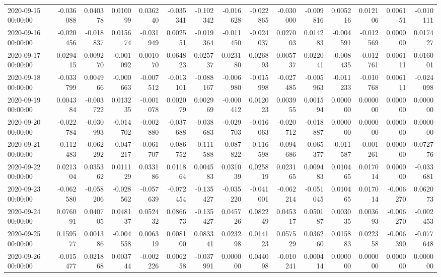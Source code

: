 \begin{tabular}{lrrrrrrrrrrrrrr}
2020-09-15 00:00:00 & -0.036088 & 0.040378 & 0.010099 & 0.036240 & -0.035341 & -0.102342 & -0.016628 & -0.022865 & -0.030000 & -0.009816 & 0.005216 & 0.012106 & 0.006151 & -0.010111 \\
2020-09-16 00:00:00 & -0.020456 & -0.018837 & 0.015674 & -0.031949 & 0.002551 & -0.019364 & -0.011450 & -0.024037 & 0.027003 & 0.014283 & -0.004591 & -0.012569 & 0.000000 & 0.017427 \\
2020-09-17 00:00:00 & 0.029415 & 0.009270 & -0.001092 & 0.001070 & 0.064823 & 0.025737 & 0.023180 & 0.026893 & 0.005737 & 0.022041 & -0.008435 & -0.012761 & 0.006111 & 0.016001 \\
2020-09-18 00:00:00 & -0.033799 & 0.004966 & -0.000663 & -0.007512 & -0.013101 & -0.088167 & -0.006980 & -0.015998 & -0.027485 & -0.005963 & -0.011233 & -0.010768 & 0.006111 & -0.024098 \\
2020-09-19 00:00:00 & 0.004384 & -0.003722 & 0.013235 & -0.001078 & 0.002079 & 0.002969 & -0.000412 & 0.012023 & 0.003955 & 0.001594 & 0.000000 & 0.000000 & 0.000000 & 0.000000 \\
2020-09-20 00:00:00 & -0.022784 & -0.030993 & -0.014702 & -0.002880 & -0.037688 & -0.038683 & -0.029703 & -0.016063 & -0.020712 & -0.018887 & 0.000000 & 0.000000 & 0.000000 & 0.000000 \\
2020-09-21 00:00:00 & -0.112483 & -0.062292 & -0.047217 & -0.061707 & -0.086752 & -0.111588 & -0.087822 & -0.116598 & -0.094686 & -0.065377 & -0.011587 & -0.001261 & 0.000000 & 0.072776 \\
2020-09-22 00:00:00 & 0.021304 & 0.035362 & 0.011129 & 0.033186 & 0.011864 & 0.004583 & 0.031039 & 0.025819 & 0.023165 & 0.009483 & 0.010465 & 0.017014 & 0.000000 & -0.033681 \\
2020-09-23 00:00:00 & -0.062580 & -0.058206 & -0.028562 & -0.057639 & -0.072454 & -0.135427 & -0.035220 & -0.041001 & -0.062214 & -0.051045 & 0.010465 & 0.017014 & -0.006270 & 0.062073 \\
2020-09-24 00:00:00 & 0.076091 & 0.040705 & 0.048137 & 0.052432 & 0.086673 & -0.135427 & 0.045726 & 0.082249 & 0.045317 & 0.050187 & 0.003035 & 0.003693 & -0.006270 & -0.002453 \\
2020-09-25 00:00:00 & 0.159577 & 0.001386 & -0.004558 & 0.006319 & 0.008100 & 0.083341 & 0.023298 & 0.014123 & 0.057529 & 0.036260 & 0.015883 & 0.022358 & -0.006390 & -0.077648 \\
2020-09-26 00:00:00 & -0.015477 & 0.021868 & 0.003744 & -0.002226 & 0.006258 & -0.037991 & 0.000000 & 0.044098 & -0.010241 & 0.000414 & 0.000000 & 0.000000 & 0.000000 & 0.000000 \\

\end{tabular}
